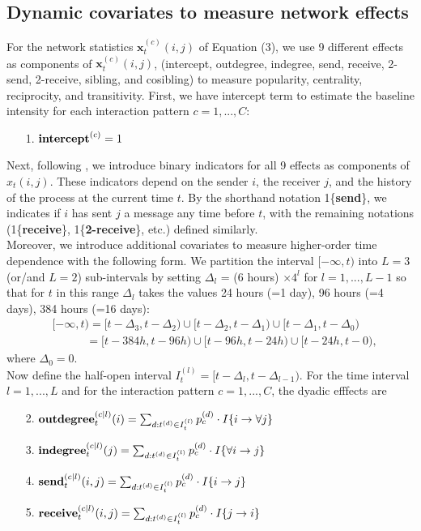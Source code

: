 \documentclass[a4paper]{article}
\begin{document}
 \subsection{Dynamic covariates to measure network effects} \label{subsec: Dynamic covariates2}
 For the network statistics $\boldsymbol{x}^{(c)}_t(i, j)$ of Equation (3), we use 9 different effects as components of $\boldsymbol{x}^{(c)}_t(i, j)$, (intercept, outdegree, indegree, send, receive, 2-send, 2-receive, sibling, and cosibling) to measure popularity, centrality, reciprocity, and transitivity. First, we have intercept term to estimate the baseline intensity for each interaction pattern $c=1,...,C$:
 \begin{itemize}
	\item [1.] $\mbox{\textbf{intercept}}^{(c)}= 1$
 \end{itemize}
Next, following \cite{PerryWolfe2012}, we introduce binary indicators for all 9 effects as components of $x_t(i, j)$. These indicators depend
on the sender $i$, the receiver $j$, and the history of the process at the current time $t$. By the
shorthand notation 1\{\textbf{send}\}, we indicates if $i$ has sent $j$ a message any time before $t$, with the remaining notations (1\{\textbf{receive}\}, 1\{\textbf{2-receive}\}, etc.) defined similarly.\\ \newline
Moreover, we introduce additional covariates to measure higher-order time dependence with the following
form. We partition the interval $[-\infty, t)$ into $L=3$ (or/and $L= 2$) sub-intervals by setting $\Delta_l$ = (6 hours) $\times  4^l$ for $l=1,...,L-1$ so that for $t$ in this range $\Delta_l$ takes the values 24 hours (=1 day), 96 hours (=4 days), 384 hours (=16 days): 
\begin{equation*}
\begin{aligned}
&[-\infty,t) =[t-\Delta_3, t-\Delta_{2}) \cup [t-\Delta_{2}, t-\Delta_{1})\cup [t-\Delta_1, t-\Delta_{0})\\& \quad\quad\quad= [t-384h, t-96h) \cup [t-96h, t-24h)\cup [t-24h, t-0),
\end{aligned}
\end{equation*}
where $\Delta_0 = 0$.\\ \newline
Now define the half-open interval $I_t^{(l)} = [t-\Delta_l, t-\Delta_{l-1})$. For the time interval $l=1,...,L$ and for the interaction pattern $c = 1,...,C$, the dyadic efffects are
 \begin{itemize}
 	 	 \item [2.]  $\mbox{\textbf{outdegree}}^{(c|l)}_t(i)=\sum_{d: t^{(d)} \in I_t^{(l)}}p_c^{(d)}\cdot I\{i\rightarrow \forall j\}$
 	 	 \item [3.] $\mbox{\textbf{indegree}}^{(c|l)}_t(j)=\sum_{d: t^{(d)} \in I_t^{(l)}}p_c^{(d)}\cdot I\{\forall i \rightarrow j\}$	 	 	
 	 	 \item [4.]  $\mbox{\textbf{send}}^{(c|l)}_t(i, j)=\sum_{d: t^{(d)} \in I_t^{(l)}}p_c^{(d)}\cdot I\{i\rightarrow j\}$
 	\item [5.] $\mbox{\textbf{receive}}^{(c|l)}_t(i, j)=\sum_{d: t^{(d)} \in I_t^{(l)}}p_c^{(d)}\cdot I\{j\rightarrow i\}$
 \end{itemize}
\end{document}

